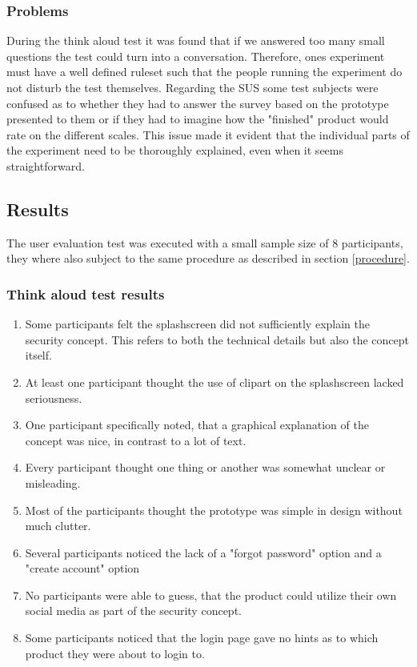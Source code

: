\subsubsection{Problems}
During the think aloud test it was found that if we answered too many small questions the test could turn into a conversation. Therefore, ones experiment must have a well defined ruleset such that the people running the experiment do not disturb the test themselves.\newline
Regarding the SUS some test subjects were confused as to whether they had to answer the survey based on the prototype presented to them or if they had to imagine how the "finished" product would rate on the different scales. This issue made it evident that the individual parts of the experiment need to be thoroughly explained, even when it seems straightforward.

\subsection{Results}
The user evaluation test was executed with a small sample size of 8 participants, they where also subject to the same procedure as described in section \ref{procedure}.

\subsubsection{Think aloud test results}
\begin{enumerate}
    \item Some participants felt the splashscreen did not sufficiently explain the security concept. This refers to both the technical details but also the concept itself. 
    \item At least one participant thought the use of clipart on the splashscreen lacked seriousness.
    \item One participant specifically noted, that a graphical explanation of the concept was nice, in contrast to a lot of text.
    \item Every participant thought one thing or another was somewhat unclear or misleading.
    \item Most of the participants thought the prototype was simple in design without much clutter.
    \item Several participants noticed the lack of a "forgot password" option and a "create account" option
    \item No participants were able to guess, that the product could utilize their own social media as part of the security concept.
    \item Some participants noticed that the login page gave no hints as to which product they were about to login to. 
\end{enumerate}


